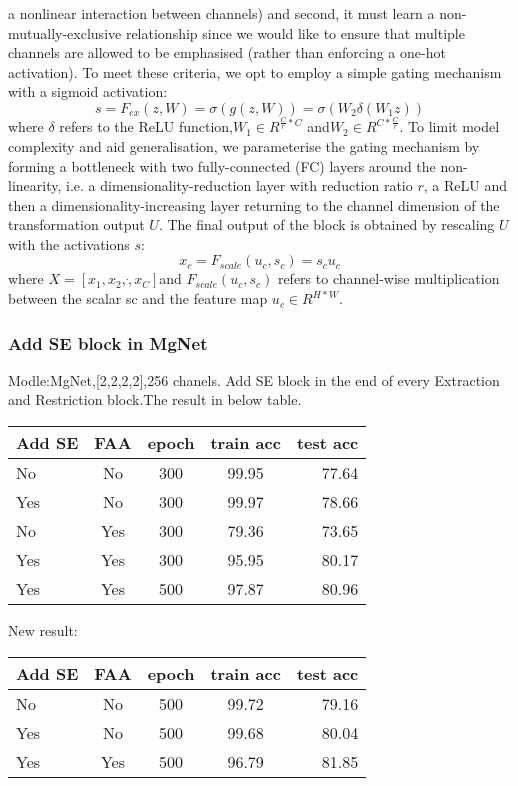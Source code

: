 a nonlinear interaction between channels) and second, it must learn a non-mutually-exclusive relationship since we would like to ensure that multiple channels are allowed to be emphasised (rather than enforcing a one-hot activation). To meet these criteria, we opt to employ a simple gating mechanism with a sigmoid activation:
\begin{equation}
s = F_{ex}(z,W)=\sigma(g(z,W)) = \sigma(W_2\delta(W_1z))
\end{equation}
where $\delta$ refers to the ReLU function,$W_1 \in  R^{\frac{C}{r}*C}$ and$W_2 \in  R^{C*\frac{C}{r}}$. To limit model complexity and aid generalisation, we parameterise the gating mechanism by forming a bottleneck with two fully-connected (FC) layers around the non-linearity, i.e. a dimensionality-reduction layer with reduction ratio $r$, a ReLU and then a dimensionality-increasing layer returning to the channel dimension of the transformation output $U$. The final output of the block is obtained by rescaling $U$ with the activations $s$:
\begin{equation}
x_c = F_{scale}(u_c,s_c) = s_cu_c
\end{equation}
where $X = [x_1,x_2,\dot ,x_C]$and $F_{scale}(u_c,s_c)$ refers to
channel-wise multiplication between the scalar sc and the
feature map $u_c \in R^{H*W}$.


\subsubsection{Add SE block in MgNet}
Modle:MgNet,[2,2,2,2],256 chanels. Add SE block in the end of every Extraction and Restriction block.The result in below table.\\
\begin{tabular}{| l | c | c | c | r |}
	\hline
	Add SE & FAA & epoch & train acc & test acc \\
	\hline
	No     & No  &  300  & 99.95     & 77.64    \\
	\hline
	Yes    & No  &  300  & 99.97     & 78.66    \\
	\hline
	No     & Yes &  300  & 79.36     & 73.65    \\
	\hline
	Yes    & Yes &  300  & 95.95     & 80.17    \\
	\hline
	Yes    & Yes &  500  & 97.87     & 80.96    \\
	\hline
\end{tabular}

New result:\\
\begin{tabular}{| l | c | c | c | r |}
	\hline
	Add SE & FAA & epoch & train acc & test acc \\
	\hline
	No     & No  &  500  & 99.72     & 79.16    \\
	\hline
	Yes    & No  &  500  & 99.68     & 80.04    \\
	\hline
	Yes    &Yes  &  500  & 96.79    &  81.85    \\
	\hline
\end{tabular}

